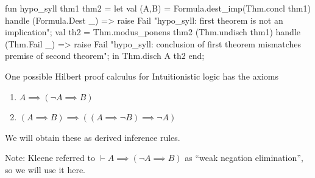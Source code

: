 \nwenddocs{}\endmoddef\nwstartdeflinemarkup{}\nwenddeflinemarkup
fun hypo_syll thm1 thm2 =
  let
    val (A,B) = Formula.dest_imp(Thm.concl thm1)
                handle (Formula.Dest _) =>
                       raise Fail "hypo_syll: first theorem is not an implication";
    val th2 = Thm.modus_ponens thm2 (Thm.undisch thm1)
              handle (Thm.Fail _) =>
                     raise Fail "hypo_syll: conclusion of first theorem mismatches premise of second theorem";
  in
    Thm.disch A th2
  end;
\eatline
{}\nwendcode{}\nwdocspar

\begin{node}
One possible Hilbert proof calculus for Intuitionistic logic has the
axioms
\begin{enumerate}
\item $A\implies(\neg A\implies B)$
\item $(A\implies B)\implies((A\implies\neg B)\implies\neg A)$
\end{enumerate}
We will obtain these as derived inference rules.

Note: Kleene referred to $\vdash A\implies(\neg A\implies B)$ as
``weak negation elimination'', so we will use it here.
\end{node}

